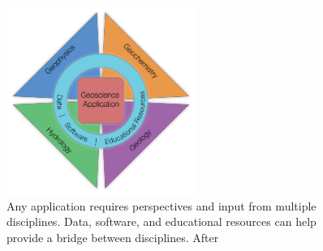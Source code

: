 \begin{figure}[!htb]
    \begin{center}
    \includegraphics[width=0.55\textwidth]{figures/pizza-box.png}
    \end{center}
\caption{
     Any application requires perspectives and input from multiple disciplines. Data, software, and educational resources can help provide a bridge between disciplines. After \citep{oldenburg_3d_2020}
}
\label{fig:pizza-box}
\end{figure}
